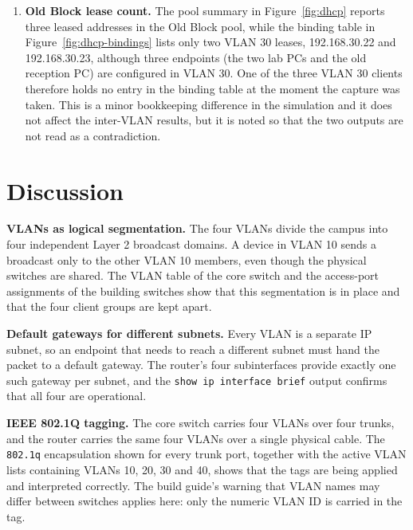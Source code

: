 \documentclass[11pt,a4paper]{article}
\newcommand{\figref}[1]{Figure~\ref{#1}}
\begin{document}
\begin{enumerate}[label=\textbf{D\arabic*.},leftmargin=2.2em]
        that crossed one router would arrive with TTL 127. The destination is now
        identified with certainty, because 192.168.20.21 is the only lease in the
        VLAN 20 subnet and therefore belongs to \texttt{CARMEL-FACULTY01}
        (\figref{fig:dhcp-bindings}), but the source device of the ping is not
        identifiable from the captured window, so the capture cannot be attributed to
        a specific named source with certainty. The result is reported as it stands.
  \item \textbf{Old Block lease count.} The pool summary in \figref{fig:dhcp} reports
        three leased addresses in the Old Block pool, while the binding table in
        \figref{fig:dhcp-bindings} lists only two VLAN 30 leases,
        192.168.30.22 and 192.168.30.23, although three endpoints (the two lab PCs and
        the old reception PC) are configured in VLAN 30. One of the three VLAN 30
        clients therefore holds no entry in the binding table at the moment the
        capture was taken. This is a minor bookkeeping difference in the simulation
        and it does not affect the inter-VLAN results, but it is noted so that the
        two outputs are not read as a contradiction.
\end{enumerate}

\section{Discussion}

\noindent
\textbf{VLANs as logical segmentation.} The four VLANs divide the campus into four
independent Layer 2 broadcast domains. A device in VLAN 10 sends a broadcast only to
the other VLAN 10 members, even though the physical switches are shared. The VLAN
table of the core switch and the access-port assignments of the building switches show
that this segmentation is in place and that the four client groups are kept apart.

\noindent
\textbf{Default gateways for different subnets.} Every VLAN is a separate IP subnet,
so an endpoint that needs to reach a different subnet must hand the packet to a
default gateway. The router's four subinterfaces provide exactly one such gateway per
subnet, and the \texttt{show ip interface brief} output confirms that all four are
operational.

\noindent
\textbf{IEEE 802.1Q tagging.} The core switch carries four VLANs over four trunks, and
the router carries the same four VLANs over a single physical cable. The \texttt{802.1q}
encapsulation shown for every trunk port, together with the active VLAN lists
containing VLANs 10, 20, 30 and 40, shows that the tags are being applied and
interpreted correctly. The build guide's warning that VLAN names may differ between
switches applies here: only the numeric VLAN ID is carried in the tag.
\end{document}
